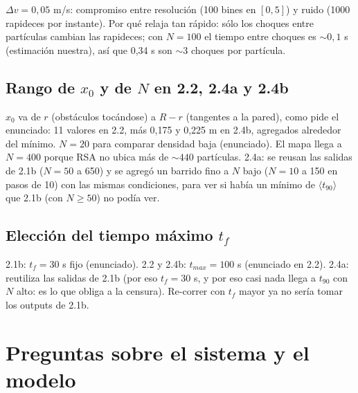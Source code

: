 \documentclass[10.5pt,a4paper]{article}
\begin{document}
$\Delta v=0{,}05$ m/s: compromiso entre resolución (100 bines en $[0,5]$) y ruido (1000 rapideces por instante). Por qué relaja tan rápido: sólo los choques entre partículas cambian las rapideces; con $N=100$ el tiempo entre choques es $\sim0{,}1$ s (estimación nuestra), así que 0,34 s son $\sim3$ choques por partícula.


\subsection{Rango de $x_0$ y de $N$ en 2.2, 2.4a y 2.4b}
$x_0$ va de $r$ (obstáculos tocándose) a $R-r$ (tangentes a la pared), como pide el enunciado: 11 valores en 2.2, más 0,175 y 0,225 m en 2.4b, agregados alrededor del mínimo. $N=20$ para comparar densidad baja (enunciado). El mapa llega a $N=400$ porque RSA no ubica más de $\sim440$ partículas. 2.4a: se reusan las salidas de 2.1b ($N=50$ a 650) y se agregó un barrido fino a $N$ bajo ($N=10$ a 150 en pasos de 10) con las mismas condiciones, para ver si había un mínimo de $\langle t_{90}\rangle$ que 2.1b (con $N\ge50$) no podía ver.

\subsection{Elección del tiempo máximo $t_f$}
2.1b: $t_f=30$ s fijo (enunciado). 2.2 y 2.4b: $t_{max}=100$ s (enunciado en 2.2). 2.4a: reutiliza las salidas de 2.1b (por eso $t_f=30$ s, y por eso casi nada llega a $t_{90}$ con $N$ alto: es lo que obliga a la censura). Re-correr con $t_f$ mayor ya no sería tomar los outputs de 2.1b.

\section{Preguntas sobre el sistema y el modelo}
\end{document}
